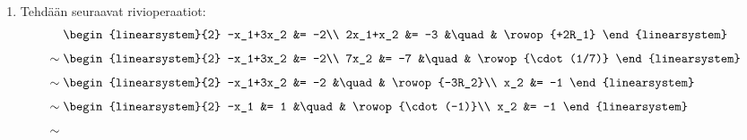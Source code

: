 \documentclass[11pt,a4paper]{amsart}
\begin{document}
\begin{solution}
\begin{enumerate}[label=\alph*), nosep]
    Valitaan \(x_1=t\in\RR\). Tällöin \(x_2=2t-3\), joten
    \[
      (x_1,x_2)
      =
      (t,2t-3)
      =
      (0,-3)
      + t
      (1,2).
    \]
    Ratkaisujoukko on siis
    \[
      \left\{
        (0,-3)
        + t
        (1,2)
        \colon\ t \in \RR
      \right\}.
    \]
    \begin{center}
    \end{center}
  \item Tehdään seuraavat rivioperaatiot:
    \[
      \begin{aligned}
        &
        \begin{linearsystem}{2}
          -x_1+3x_2 &= -2\\
          2x_1+x_2 &= -3 &\quad& \rowop{+2R_1}
        \end{linearsystem}\\[1ex]
        \sim{}&
        \begin{linearsystem}{2}
          -x_1+3x_2 &= -2\\
          7x_2 &= -7 &\quad& \rowop{\cdot(1/7)}
        \end{linearsystem}\\[1ex]
        \sim{}&
        \begin{linearsystem}{2}
          -x_1+3x_2 &= -2 &\quad& \rowop{-3R_2}\\
          x_2 &= -1
        \end{linearsystem}\\[1ex]
        \sim{}&
        \begin{linearsystem}{2}
          -x_1 &= 1 &\quad& \rowop{\cdot(-1)}\\
          x_2 &= -1
        \end{linearsystem}\\[1ex]
        \sim{}&

\end{aligned}\]
\end{enumerate}
\end{solution}
\end{document}
